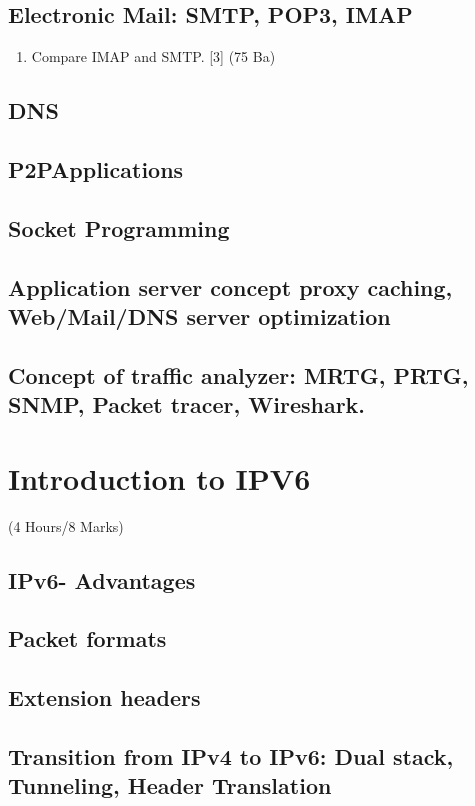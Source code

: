 \documentclass[12pt]{article}
\begin{document}
	\subsection{Electronic Mail: SMTP, POP3, IMAP}
		\begin{enumerate}
			\item Compare IMAP and SMTP. \hfill [3] (75 Ba)
		\end{enumerate}
	\subsection{DNS}
	\subsection{P2PApplications}
	\subsection{Socket Programming}
	\subsection{Application server concept proxy caching, Web/Mail/DNS server optimization}
	\subsection{Concept of traffic analyzer: MRTG, PRTG, SNMP, Packet tracer, Wireshark.}

	\pagebreak

\section{Introduction to IPV6}
	\begin{center}(4 Hours/8 Marks)\end{center}
	\subsection{IPv6- Advantages}
	\subsection{Packet formats}
	\subsection{Extension headers}
	\subsection{Transition from IPv4 to IPv6: Dual stack, Tunneling, Header Translation}
\end{document}
